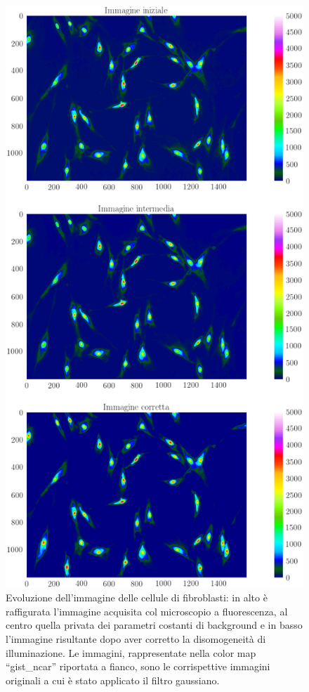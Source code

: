 \begin{figure}
 \centering
 \includegraphics[scale=.50]{img/CAP4cmap.png}
 \caption{\small{Evoluzione dell'immagine delle cellule di fibroblasti: in alto è raffigurata l'immagine acquisita col microscopio a fluorescenza, al centro quella privata dei parametri costanti di background e in basso l'immagine risultante dopo aver corretto la disomogeneità di illuminazione. Le immagini, rappresentate nella color map ``gist\_ncar'' riportata a fianco, sono le corrispettive immagini originali a cui è stato applicato il filtro gaussiano.}}
 \label{fig:cmap}
\end{figure}

